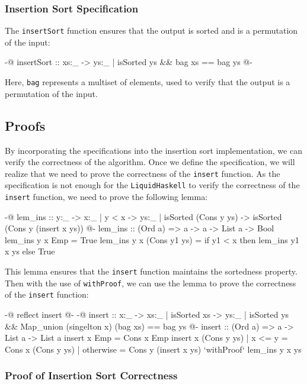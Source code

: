\documentclass[]{rptuseminar}
\begin{document}
\subsubsection{Insertion Sort Specification}

The \texttt{insertSort} function ensures that the output is sorted and is a permutation of the input:

\begin{haskell}
{-@ insertSort :: xs:_ -> {ys:_ | isSorted ys && bag xs == bag ys} @-}
\end{haskell}

Here, \texttt{bag} represents a multiset of elements, used to verify that the output is a permutation of the input.

\subsection{Proofs}
By incorporating the specifications into the insertion sort implementation, we can verify the correctness of the algorithm.
Once we define the specification, we will realize that we need to prove the correctness of the \texttt{insert} function.
As the specification is not enough for the \texttt{LiquidHaskell} to verify the correctness of the \texttt{insert} function, we need to prove the following lemma:

\begin{haskell}
{-@ lem_ins :: y:_ -> {x:_ | y < x} -> {ys:_ | isSorted (Cons y ys)} 
    -> {isSorted (Cons y (insert x ys))} @-}
lem_ins :: (Ord a) => a -> a -> List a -> Bool
lem_ins y x Emp = True
lem_ins y x (Cons y1 ys) = if y1 < x then lem_ins y1 x ys else True
\end{haskell}

This lemma ensures that the \texttt{insert} function maintains the sortedness property.
Then with the use of \texttt{withProof}, we can use the lemma to prove the correctness of the \texttt{insert} function:

\begin{haskell}
{-@ reflect insert @-}
{-@ insert :: x:_ -> {xs:_ | isSorted xs} 
  -> {ys:_ | isSorted ys && Map_union (singelton x) (bag xs) == bag ys  } @-}
insert :: (Ord a) => a -> List a -> List a
insert x Emp = Cons x Emp
insert x (Cons y ys)
  | x <= y = Cons x (Cons y ys)
  | otherwise = Cons y (insert x ys) `withProof` lem_ins y x ys
\end{haskell}

\subsubsection{Proof of Insertion Sort Correctness}
\end{document}
